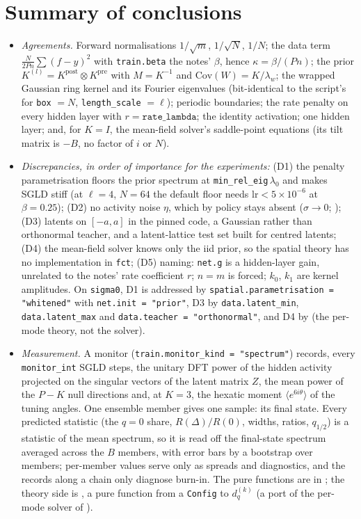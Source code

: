 \documentclass[11pt,a4paper]{article}
\newcommand{\code}[1]{\texttt{#1}}
\begin{document}
\section*{Summary of conclusions}
\begin{itemize}[nosep]
  \item \emph{Agreements.} Forward normalisations $1/\sqrt m$, $1/\sqrt N$, $1/N$; the data term $\frac N{2Pn}\sum(f-y)^2$ with \code{train.beta} the notes' $\beta$, hence $\kappa = \beta/(Pn)$; the prior $K^{(l)} = K^{\mathrm{post}}\otimes K^{\mathrm{pre}}$ with $M = K^{-1}$ and $\mathrm{Cov}(W) = K/\lambda_w$; the wrapped Gaussian ring kernel and its Fourier eigenvalues (bit-identical to the script's for \code{box} $= N$, \code{length\_scale} $= \ell$); periodic boundaries; the rate penalty on every hidden layer with $r = \code{rate\_lambda}$; the identity activation; one hidden layer; and, for $K = I$, the mean-field solver's saddle-point equations (its tilt matrix is $-B$, no factor of $i$ or $N$).
  \item \emph{Discrepancies, in order of importance for the experiments:} (D1) the penalty parametrisation floors the prior spectrum at \code{min\_rel\_eig}$\,\lambda_0$ and makes SGLD stiff (at $\ell = 4$, $N = 64$ the default floor needs $\mathrm{lr} < 5\times10^{-6}$ at $\beta = 0.25$); (D2) no activity noise $\eta$, which by policy stays absent ($\sigma\to0$; ); (D3) latents on $[-a,a]$ in the pinned code, a Gaussian rather than orthonormal teacher, and a latent-lattice test set built for centred latents; (D4) the mean-field solver knows only the iid prior, so the spatial theory has no implementation in \code{fct}; (D5) naming: \code{net.g} is a hidden-layer gain, unrelated to the notes' rate coefficient $r$; $n = m$ is forced; $k_0$, $k_1$ are kernel amplitudes. On \code{sigma0}, D1 is addressed by \code{spatial.parametrisation = "whitened"} with \code{net.init = "prior"}, D3 by \code{data.latent\_min}, \code{data.latent\_max} and \code{data.teacher = "orthonormal"}, and D4 by  (the per-mode theory, not the solver).
  \item \emph{Measurement.} A monitor (\code{train.monitor\_kind = "spectrum"}) records, every \code{monitor\_int} SGLD steps, the unitary DFT power of the hidden activity projected on the singular vectors of the latent matrix $Z$, the mean power of the $P - K$ null directions and, at $K = 3$, the hexatic moment $\langle e^{6i\theta}\rangle$ of the tuning angles. One ensemble member gives one sample: its final state. Every predicted statistic (the $q = 0$ share, $R(\Delta)/R(0)$, widths, ratios, $q_{1/2}$) is a statistic of the mean spectrum, so it is read off the final-state spectrum averaged across the $B$ members, with error bars by a bootstrap over members; per-member values serve only as spreads and diagnostics, and the records along a chain only diagnose burn-in. The pure functions are in ; the theory side is , a pure function from a \code{Config} to $d^{(k)}_q$ (a port of the per-mode solver of ).

\end{itemize}
\end{document}
